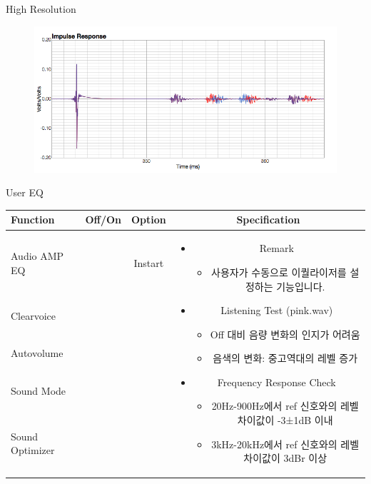 \documentclass{beamer}
\begin{document}
\begin{frame}[t]{High Resolution}
\begin{figure}[b]
\includegraphics[height=0.32\textwidth]{figure/highresolution.png}
\end{figure}

\end{frame}


\begin{frame}[t]{User EQ}
\begin{tiny}
\begin{tabular}{@{}lccc@{}}
\toprule
Function & Off/On & Option & Specification \\
\midrule
Audio AMP EQ & \color{black}{Off} & Instart &
\multirow{14}{60mm}{
\begin{itemize}
\item Remark
	\begin{itemize}
	\item 사용자가 수동으로 이퀄라이저를 설정하는 기능입니다.
	\end{itemize}
\item Listening Test (pink.wav)
	\begin{itemize}
	\item Off 대비 음량 변화의 인지가 어려움
	\item 음색의 변화: 중고역대의 레벨 증가
	\end{itemize}
\item Frequency Response Check
  \begin{itemize}
  \item 20Hz-900Hz에서 ref 신호와의 레벨 차이값이 -3±1dB 이내
  \item 3kHz-20kHz에서 ref 신호와의 레벨 차이값이 3dBr 이상
  \end{itemize}
\end{itemize}
} \\
Clearvoice & \color{black}{Off} & & \\
Autovolume & \color{black}{Off} & & \\
Sound Mode & \color{black}{Off} & & \\
Sound Optimizer & \color{black}{Off} & & \\

\end{tabular}
\end{tiny}
\end{frame}
\end{document}
